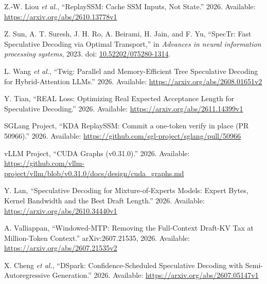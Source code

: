 \documentclass[11pt,a4paper,UTF8,fontset=none,scheme=plain,zihao=-4]{ctexart}
\newenvironment{CSLReferences}[2]{%
  \footnotesize
  \raggedright
  \setlength{\leftskip}{3em}%
  \setlength{\parindent}{-3em}%
  \setlength{\parskip}{0.1\baselineskip}%
  \sloppy
}{}
\newcommand{\CSLLeftMargin}[1]{\makebox[3em][l]{#1}}
\newcommand{\CSLRightInline}[1]{#1}
\begin{document}
\begin{CSLReferences}{0}{0}
\leavevmode{}%
\CSLLeftMargin{{[}15{]} }
\CSLRightInline{Z.-W. Liou \emph{et al.}, {``{ReplaySSM: Cache SSM
Inputs, Not State}.''} 2026. Available:
\url{https://arxiv.org/abs/2610.13778v1}}

\leavevmode{}%
\CSLLeftMargin{{[}16{]} }
\CSLRightInline{Z. Sun, A. T. Suresh, J. H. Ro, A. Beirami, H. Jain, and
F. Yu, {``{SpecTr: Fast Speculative Decoding via Optimal Transport},''}
in \emph{Advances in neural information processing systems}, 2023. doi:
\href{https://doi.org/10.52202/075280-1314}{10.52202/075280-1314}.}

\leavevmode{}%
\CSLLeftMargin{{[}17{]} }
\CSLRightInline{L. Wang \emph{et al.}, {``{Twig: Parallel and
Memory-Efficient Tree Speculative Decoding for Hybrid-Attention
LLMs}.''} 2026. Available: \url{https://arxiv.org/abs/2608.01651v2}}

\leavevmode{}%
\CSLLeftMargin{{[}18{]} }
\CSLRightInline{Y. Tian, {``{REAL Loss: Optimizing Real Expected
Acceptance Length for Speculative Decoding}.''} 2026. Available:
\url{https://arxiv.org/abs/2611.14399v1}}

\leavevmode{}%
\CSLLeftMargin{{[}19{]} }
\CSLRightInline{SGLang Project, {``{KDA ReplaySSM: Commit a one-token
verify in place (PR 50966)}.''} 2026. Available:
\url{https://github.com/sgl-project/sglang/pull/50966}}

\leavevmode{}%
\CSLLeftMargin{{[}20{]} }
\CSLRightInline{vLLM Project, {``{CUDA Graphs (v0.31.0)}.''} 2026.
Available:
\url{https://github.com/vllm-project/vllm/blob/v0.31.0/docs/design/cuda_graphs.md}}

\leavevmode{}%
\CSLLeftMargin{{[}21{]} }
\CSLRightInline{Y. Lan, {``{Speculative Decoding for Mixture-of-Experts
Models: Expert Bytes, Kernel Bandwidth and the Best Draft Length}.''}
2026. Available: \url{https://arxiv.org/abs/2610.34440v1}}

\leavevmode{}%
\CSLLeftMargin{{[}22{]} }
\CSLRightInline{A. Valliappan, {``{Windowed-MTP: Removing the
Full-Context Draft-KV Tax at Million-Token Context}.''}
arXiv:2607.21535, 2026. Available:
\url{https://arxiv.org/abs/2607.21535v2}}

\leavevmode{}%
\CSLLeftMargin{{[}23{]} }
\CSLRightInline{X. Cheng \emph{et al.}, {``{DSpark: Confidence-Scheduled
Speculative Decoding with Semi-Autoregressive Generation}.''} 2026.
Available: \url{https://arxiv.org/abs/2607.05147v1}}


\end{CSLReferences}
\end{document}
